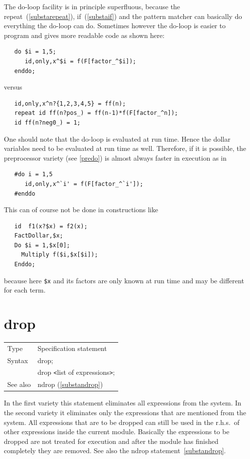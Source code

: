 \noindent The do-loop facility is in principle superfluous, because the 
repeat~(\ref{substarepeat}), if~(\ref{substaif}) and the pattern matcher can 
basically do everything the do-loop can do. Sometimes however the do-loop 
is easier to program and gives more readable code as shown here:
\begin{verbatim}
   do $i = 1,5;
      id,only,x^$i = f(F[factor_^$i]);
   enddo;
\end{verbatim}
\noindent versus
\begin{verbatim}
   id,only,x^n?{1,2,3,4,5} = ff(n);
   repeat id ff(n?pos_) = ff(n-1)*f(F[factor_^n]);
   id ff(n?neg0_) = 1;
\end{verbatim}
\noindent One should note that the do-loop is evaluated at run time. Hence 
the dollar variables need to be evaluated at run time as well. Therefore, 
if it is possible, the preprocessor variety (see \ref{predo}) is almost 
always faster in execution as in
\begin{verbatim}
   #do i = 1,5
      id,only,x^`i' = f(F[factor_^`i']);
   #enddo
\end{verbatim}
\noindent This can of course not be done in constructions like
\begin{verbatim}
   id  f1(x?$x) = f2(x);
   FactDollar,$x;
   Do $i = 1,$x[0];
     Multiply f($i,$x[$i]);
   Enddo;
\end{verbatim}
\noindent because here \verb:$x: and its factors are only known at run time 
and may be different for each term.
\vspace{10mm}


\section{drop}
\label{substadrop}

\noindent \begin{tabular}{ll}
Type & Specification statement\\
Syntax & drop; \\
       & drop {\tt<}list of expressions{\tt>};
\\ See also & ndrop (\ref{substandrop})
\end{tabular} \vspace{4mm}

\noindent In the first variety this statement eliminates all 
expressions from the system. In the second variety it 
eliminates only the expressions that are mentioned from the system. All 
expressions that are to be dropped can still be used in the r.h.s.\ of other 
expressions inside the current module. Basically the expressions to be 
dropped are not treated for execution and after the module has finished 
completely they are removed. See also the ndrop 
statement~\ref{substandrop}. \vspace{10mm}

